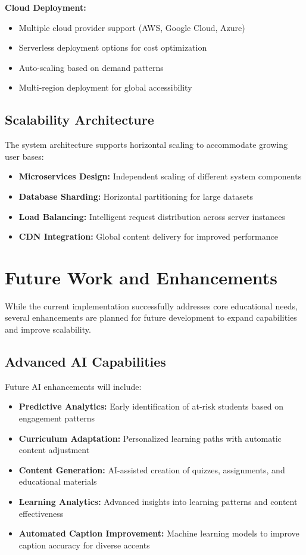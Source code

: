 \documentclass[onecolumn]{IEEEtran}
\begin{document}
\textbf{Cloud Deployment:}
\begin{itemize}
\item Multiple cloud provider support (AWS, Google Cloud, Azure)
\item Serverless deployment options for cost optimization
\item Auto-scaling based on demand patterns
\item Multi-region deployment for global accessibility
\end{itemize}

\subsection{Scalability Architecture}

The system architecture supports horizontal scaling to accommodate growing user bases:

\begin{itemize}
\item \textbf{Microservices Design:} Independent scaling of different system components
\item \textbf{Database Sharding:} Horizontal partitioning for large datasets
\item \textbf{Load Balancing:} Intelligent request distribution across server instances
\item \textbf{CDN Integration:} Global content delivery for improved performance
\end{itemize}

\section{Future Work and Enhancements}

While the current implementation successfully addresses core educational needs, several enhancements are planned for future development to expand capabilities and improve scalability.

\subsection{Advanced AI Capabilities}

Future AI enhancements will include:

\begin{itemize}
\item \textbf{Predictive Analytics:} Early identification of at-risk students based on engagement patterns
\item \textbf{Curriculum Adaptation:} Personalized learning paths with automatic content adjustment
\item \textbf{Content Generation:} AI-assisted creation of quizzes, assignments, and educational materials
\item \textbf{Learning Analytics:} Advanced insights into learning patterns and content effectiveness
\item \textbf{Automated Caption Improvement:} Machine learning models to improve caption accuracy for diverse accents
\end{itemize}
\end{document}
